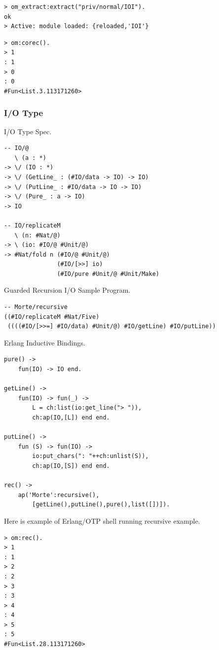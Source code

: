 \documentclass{aip-cp}
\begin{document}
\begin{lstlisting}[mathescape=true]
> om_extract:extract("priv/normal/IOI").
ok
> Active: module loaded: {reloaded,'IOI'}
\end{lstlisting}

\begin{lstlisting}[mathescape=true]
> om:corec().
> 1
: 1
> 0
: 0
#Fun<List.3.113171260>
\end{lstlisting}

\subsubsection{I/O Type}

I/O Type Spec.

\begin{lstlisting}[mathescape=true]
-- IO/@
   \ (a : *)
-> \/ (IO : *)
-> \/ (GetLine_ : (#IO/data -> IO) -> IO)
-> \/ (PutLine_ : #IO/data -> IO -> IO)
-> \/ (Pure_ : a -> IO)
-> IO

-- IO/replicateM
   \ (n: #Nat/@)
-> \ (io: #IO/@ #Unit/@)
-> #Nat/fold n (#IO/@ #Unit/@)
               (#IO/[>>] io)
               (#IO/pure #Unit/@ #Unit/Make)
\end{lstlisting}

Guarded Recursion I/O Sample Program.

\begin{lstlisting}[mathescape=true]
-- Morte/recursive
((#IO/replicateM #Nat/Five)
 ((((#IO/[>>=] #IO/data) #Unit/@) #IO/getLine) #IO/putLine))
\end{lstlisting}

Erlang Inductive Bindings.

\begin{lstlisting}[mathescape=true]
pure() ->
    fun(IO) -> IO end.

getLine() ->
    fun(IO) -> fun(_) ->
        L = ch:list(io:get_line("> ")),
        ch:ap(IO,[L]) end end.

putLine() ->
    fun (S) -> fun(IO) ->
        io:put_chars(": "++ch:unlist(S)),
        ch:ap(IO,[S]) end end.

rec() ->
    ap('Morte':recursive(),
        [getLine(),putLine(),pure(),list([])]).
\end{lstlisting}


Here is example of Erlang/OTP shell running recursive example.

\begin{lstlisting}[mathescape=true]
> om:rec().
> 1
: 1
> 2
: 2
> 3
: 3
> 4
: 4
> 5
: 5
#Fun<List.28.113171260>
\end{lstlisting}
\end{document}
